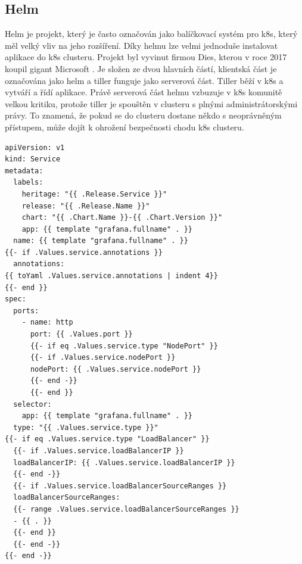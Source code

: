 \subsection{Helm}
Helm je projekt, který je často označován jako balíčkovací systém pro k8s, který měl velký vliv na jeho rozšíření. Díky helmu lze velmi jednoduše instalovat aplikace do k8s clusteru. Projekt byl vyvinut firmou Dies, kterou v roce 2017 koupil gigant Microsoft \cite{helm_deis}. Je složen ze dvou hlavních částí, klientská část je označována jako helm a tiller funguje jako serverová část. Tiller běží v k8s a vytváří a řídí aplikace. Právě serverová část helmu vzbuzuje v k8s komunitě velkou kritiku, protože tiller je spouštěn v clusteru s plnými administrátorskými právy. To znamená, že pokud se do clusteru dostane někdo s neoprávněným přístupem, může dojít k ohrožení bezpečnosti chodu k8s clusteru.

\begin{lstlisting}[caption={Kubernetes Manifest - Grafana service, zdroj vlastní},label={lst:helm_temp}]
apiVersion: v1
kind: Service
metadata:
  labels:
    heritage: "{{ .Release.Service }}"
    release: "{{ .Release.Name }}"
    chart: "{{ .Chart.Name }}-{{ .Chart.Version }}"
    app: {{ template "grafana.fullname" . }}
  name: {{ template "grafana.fullname" . }}
{{- if .Values.service.annotations }}
  annotations:
{{ toYaml .Values.service.annotations | indent 4}}
{{- end }}
spec:
  ports:
    - name: http
      port: {{ .Values.port }}
      {{- if eq .Values.service.type "NodePort" }}
      {{- if .Values.service.nodePort }}
      nodePort: {{ .Values.service.nodePort }}
      {{- end -}}
      {{- end }}
  selector:
    app: {{ template "grafana.fullname" . }}
  type: "{{ .Values.service.type }}"
{{- if eq .Values.service.type "LoadBalancer" }}
  {{- if .Values.service.loadBalancerIP }}
  loadBalancerIP: {{ .Values.service.loadBalancerIP }}
  {{- end -}}
  {{- if .Values.service.loadBalancerSourceRanges }}
  loadBalancerSourceRanges:
  {{- range .Values.service.loadBalancerSourceRanges }}
  - {{ . }}
  {{- end }}
  {{- end -}}
{{- end -}}
\end{lstlisting}

